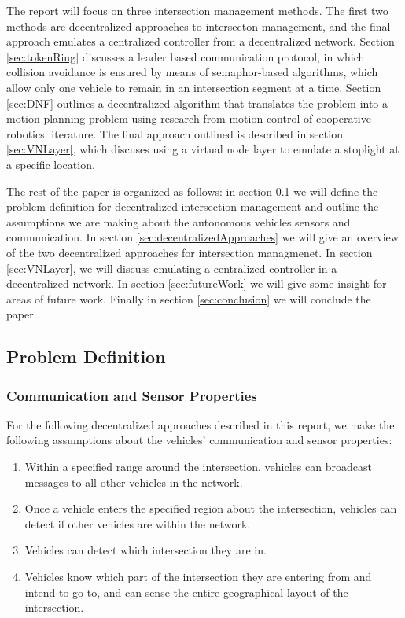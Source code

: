 \documentclass[12pt]{article}
\begin{document}
The report will focus on three intersection management methods.  The first two methods are decentralized approaches to intersecton management, and the final approach emulates a centralized controller from a decentralized network.  Section \ref{sec:tokenRing}  discusses a leader based communication protocol, in which  collision avoidance is ensured by means of semaphor-based algorithms, which allow only one vehicle to remain in an intersection segment at a time.  Section \ref{sec:DNF} outlines a decentralized algorithm that translates the problem into a motion planning problem using research from motion control of cooperative robotics literature.  The final approach outlined is described in section \ref{sec:VNLayer}, which discuses using a virtual node layer to emulate a stoplight at a specific location. 
 
The rest of the  paper is organized as follows: in section \ref{sec:problemDefinition} we will define the problem definition for decentralized intersection management and outline the assumptions we are making about the autonomous vehicles sensors and communication.  In section \ref{sec:decentralizedApproaches} we will give an overview of the two decentralized approaches for intersection managmenet.  In section \ref{sec:VNLayer}, we will discuss emulating a centralized controller in a decentralized network.  In section \ref{sec:futureWork} we will give some insight for areas of future work.  Finally in section \ref{sec:conclusion} we will conclude the paper.

\subsection{Problem Definition}
\label{sec:problemDefinition}
\subsubsection{Communication and Sensor Properties}
For the following decentralized approaches described in this report, we make the following assumptions about the vehicles' communication and sensor properties:
\begin{enumerate}
\item Within a specified range around the intersection, vehicles can broadcast messages to all other vehicles in the network. %
\item
Once a vehicle enters the specified region about the intersection, vehicles can detect if other vehicles are within the network. 
\item
Vehicles can detect which intersection they are in.
\item
Vehicles know which part of the intersection they are entering from and intend to go to, and can sense the entire geographical layout of the intersection.
\end{enumerate}
\end{document}
